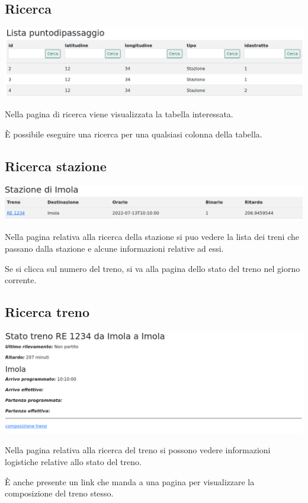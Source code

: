 \documentclass[a4paper,12pt]{report}
\begin{document}
	\subsection{Ricerca}
	\includegraphics[width=\linewidth]{res/screenshots/lista.png}
	\par Nella pagina di ricerca viene visualizzata la tabella interessata.
	\par \`E possibile eseguire una ricerca per una qualsiasi colonna della tabella.
	\subsection{Ricerca stazione}
	\includegraphics[width=\linewidth]{res/screenshots/stazione.png}
	\par Nella pagina relativa alla ricerca della stazione si puo vedere la lista dei treni che passano dalla stazione e alcune informazioni relative ad essi.
	\par Se si clicca sul numero del treno, si va alla pagina dello stato del treno nel giorno corrente.
	\subsection{Ricerca treno}
	\includegraphics[width=\linewidth]{res/screenshots/stato_treno.png}
	\par Nella pagina relativa alla ricerca del treno si possono vedere informazioni logistiche relative allo stato del treno.
	\par \`E anche presente un link che manda a una pagina per visualizzare la composizione del treno stesso.
	\appendix
\end{document}
